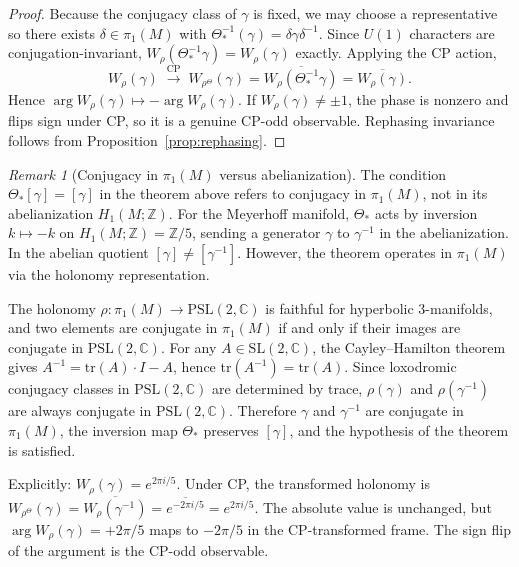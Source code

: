 \documentclass[12pt]{article}
\theoremstyle{remark}
\newtheorem{remark}[theorem]{Remark}
\theoremstyle{plain}
\begin{document}
\begin{proof}
Because the conjugacy class of $\gamma$ is fixed, we may choose a representative
so there exists $\delta\in\pi_1(M)$ with $\Theta_*^{-1}(\gamma)=\delta\gamma\delta^{-1}$.
Since $U(1)$ characters are conjugation-invariant,
$W_\rho(\Theta_*^{-1}\gamma) = W_\rho(\gamma)$ exactly.
Applying the CP action,
\[
W_\rho(\gamma) \;\xrightarrow{\text{CP}}\; W_{\rho^\Theta}(\gamma)
= \overline{W_\rho(\Theta_*^{-1}\gamma)} = \overline{W_\rho(\gamma)}.
\]
Hence $\arg W_\rho(\gamma) \mapsto -\arg W_\rho(\gamma)$.
If $W_\rho(\gamma) \neq \pm 1$, the phase is nonzero and flips sign under CP,
so it is a genuine CP-odd observable.  Rephasing invariance follows from
Proposition~\ref{prop:rephasing}.
\end{proof}

\begin{remark}[Conjugacy in $\pi_1(M)$ versus abelianization]
\label{rem:conjugacy}
The condition $\Theta_*[\gamma] = [\gamma]$ in the theorem above
refers to conjugacy in $\pi_1(M)$, not in its abelianization
$H_1(M;\mathbb{Z})$. For the Meyerhoff manifold, $\Theta_*$ acts by
inversion $k \mapsto -k$ on $H_1(M;\mathbb{Z}) = \mathbb{Z}/5$,
sending a generator $\gamma$ to $\gamma^{-1}$ in the abelianization.
In the abelian quotient $[\gamma] \neq [\gamma^{-1}]$. However, the
theorem operates in $\pi_1(M)$ via the holonomy representation.

The holonomy $\rho \colon \pi_1(M) \to \mathrm{PSL}(2,\mathbb{C})$
is faithful for hyperbolic 3-manifolds, and two elements are conjugate
in $\pi_1(M)$ if and only if their images are conjugate in
$\mathrm{PSL}(2,\mathbb{C})$. For any $A \in \mathrm{SL}(2,\mathbb{C})$,
the Cayley--Hamilton theorem gives $A^{-1} = \mathrm{tr}(A)\cdot I - A$,
hence $\mathrm{tr}(A^{-1}) = \mathrm{tr}(A)$. Since loxodromic conjugacy
classes in $\mathrm{PSL}(2,\mathbb{C})$ are determined by trace,
$\rho(\gamma)$ and $\rho(\gamma^{-1})$ are always conjugate in
$\mathrm{PSL}(2,\mathbb{C})$. Therefore $\gamma$ and $\gamma^{-1}$
are conjugate in $\pi_1(M)$, the inversion map $\Theta_*$ preserves
$[\gamma]$, and the hypothesis of the theorem is satisfied.

Explicitly: $W_\rho(\gamma) = e^{2\pi i/5}$. Under CP, the transformed
holonomy is $W_{\rho^\Theta}(\gamma) = \overline{W_\rho(\gamma^{-1})}
= \overline{e^{-2\pi i/5}} = e^{2\pi i/5}$. The absolute value is
unchanged, but $\arg W_\rho(\gamma) = +2\pi/5$ maps to $-2\pi/5$ in
the CP-transformed frame. The sign flip of the argument is the CP-odd
observable.
\end{remark}
\end{document}
